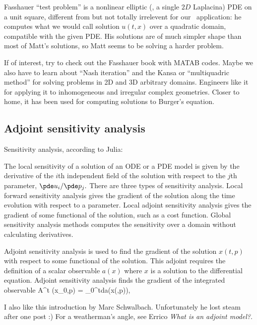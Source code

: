 \begin{description}
{    Fasshauer ``test problem'' is a nonlinear elliptic
    (\ie, a single $2D$ Laplacina) PDE on a unit square, different from
    but not totally irrelevent for our \KS\ application: he computes what
    we would call solution $u(t,x)$ over a quadratic domain, compatible
    with the given PDE. His solutions are of much simpler shape than most
    of Matt's solutions, so Matt seems to be solving a harder problem.

If of interest, try to check out the Fasshauer book with MATAB
codes.
Maybe we also have to learn about ``Nash iteration'' and the
Kansa or ``multiquadric method'' for solving problems in
2D and 3D arbitrary domains. Engineers like it for applying it to inhomogeneous
and irregular complex geometries. Closer to home, it has been used for computing
solutions to Burger's equation.

    }

\end{description}

\subsection{Adjoint sensitivity analysis}
\label{sect:AdjSenAn}

Sensitivity analysis, according to
{Julia}:

The local sensitivity of a solution of an ODE or a PDE model is given by the
derivative of the $i$th independent field of the solution with respect to the
$j$th parameter,
\( {\pde u_i}/{\pde p_j}. \)
There are three types of sensitivity analysis.
Local forward sensitivity analysis gives the gradient of the solution  along the
time evolution with respect to a parameter.
Local adjoint sensitivity analysis gives the gradient of some
functional of the solution, such as a cost function.
Global sensitivity analysis methods computes the
sensitivity over a domain without calculating derivatives.

Adjoint sensitivity analysis is used to find the gradient of the solution
$x(t,p)$ with respect to some functional of the solution. This adjoint requires
the definition of a scalar observable $a(x)$ where $x$ is a solution to the
differential equation.
Adjoint sensitivity analysis finds the gradient of
the integrated observable
\beq
A^t (x_0,p) = \int_{0}^{t}d\tau a(x(\tau,p)),

I also like this
{introduction} by Marc Schwalbach. Unfortunately he lost steam after one post :)
For a weatherman's angle, see
Errico {\em What is an adjoint model?}.


